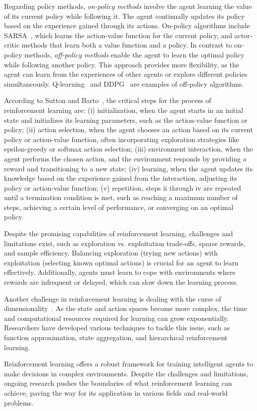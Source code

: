 Regarding policy methods, \emph{on-policy methods} involve the agent learning the value of its current policy while following it.
The agent continually updates its policy based on the experience gained through its actions.
On-policy algorithms include SARSA~\cite{rummery1994}, which learns the action-value function for the current policy, and actor-critic methods that learn both a value function and a policy.
In contrast to on-policy methods, \emph{off-policy methods} enable the agent to learn the optimal policy while following another policy.
This approach provides more flexibility, as the agent can learn from the experiences of other agents or explore different policies simultaneously.
Q-learning~\cite{watkins1992} and \ac{DDPG}~\cite{wang2022} are examples of off-policy algorithms.

According to Sutton and Barto~\cite{sutton1998}, the critical steps for the process of reinforcement learning are:
(i) initialization, when the agent starts in an initial state and initializes its learning parameters, such as the action-value function or policy;
(ii) action selection, when the agent chooses an action based on its current policy or action-value function, often incorporating exploration strategies like epsilon-greedy or softmax action selection;
(iii) environment interaction, when the agent performs the chosen action, and the environment responds by providing a reward and transitioning to a new state;
(iv) learning, when the agent updates its knowledge based on the experience gained from the interaction, adjusting its policy or action-value function;
(v) repetition, steps ii through iv are repeated until a termination condition is met, such as reaching a maximum number of steps, achieving a certain level of performance, or converging on an optimal policy.

Despite the promising capabilities of reinforcement learning, challenges and limitations exist, such as exploration vs. exploitation trade-offs, sparse rewards, and sample efficiency.
Balancing exploration (trying new actions) with exploitation (selecting known optimal actions) is crucial for an agent to learn effectively.
Additionally, agents must learn to cope with environments where rewards are infrequent or delayed, which can slow down the learning process.

Another challenge in reinforcement learning is dealing with the curse of dimensionality~\cite{weber1998}.
As the state and action spaces become more complex, the time and computational resources required for learning can grow exponentially.
Researchers have developed various techniques to tackle this issue, such as function approximation, state aggregation, and hierarchical reinforcement learning.

Reinforcement learning offers a robust framework for training intelligent agents to make decisions in complex environments.
Despite the challenges and limitations, ongoing research pushes the boundaries of what reinforcement learning can achieve, paving the way for its application in various fields and real-world problems.
